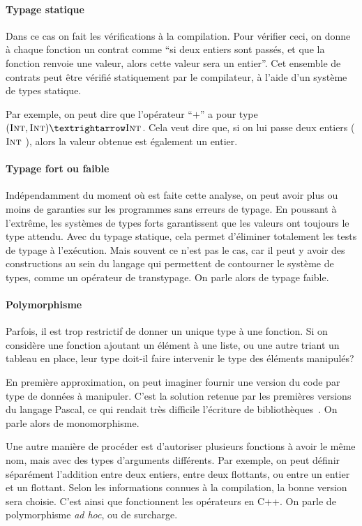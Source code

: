 \paragraph{Typage statique}

Dans ce cas on fait les vérifications à la compilation. Pour vérifier ceci, on
donne à chaque fonction un contrat comme \enquote{si deux entiers sont passés,
et que la fonction renvoie une valeur, alors cette valeur sera un entier}. Cet
ensemble de contrats peut être vérifié statiquement par le compilateur, à l'aide
d'un système de types statique.

Par exemple, on peut dire que l'opérateur \enquote{$+$} a pour type $(\tInt, \tInt) →
\tInt$. Cela veut dire que, si on lui passe deux entiers ($\textsc{Int}$ \tInt), alors
la valeur obtenue est également un entier.

\paragraph{Typage fort ou faible}

Indépendamment du moment où est faite cette analyse, on peut avoir plus ou moins
de garanties sur les programmes sans erreurs de typage. En poussant à l'extrême,
les systèmes de types forts garantissent que les valeurs ont toujours le type
attendu. Avec du typage statique, cela permet d'éliminer totalement les tests de
typage à l'exécution. Mais souvent ce n'est pas le cas, car il peut y avoir des
constructions au sein du langage qui permettent de contourner le système de
types, comme un opérateur de transtypage. On parle alors de typage faible.

\paragraph{Polymorphisme}

Parfois, il est trop restrictif de donner un unique type à une fonction. Si on
considère une fonction ajoutant un élément à une liste, ou une autre
triant un tableau en place, leur type doit-il faire intervenir le type des
éléments manipulés?

En première approximation, on peut imaginer fournir une version du code par type
de données à manipuler. C'est la solution retenue par les premières versions du
langage Pascal, ce qui rendait très difficile l'écriture de
bibliothèques~\cite{PascalNoEscape}. On parle alors de monomorphisme.

Une autre manière de procéder est d'autoriser plusieurs fonctions à avoir le
même nom, mais avec des types d'arguments différents. Par exemple, on peut
définir séparément l'addition entre deux entiers, entre deux flottants, ou entre
un entier et un flottant. Selon les informations connues à la compilation, la
bonne version sera choisie. C'est ainsi que fonctionnent les opérateurs en C++.
On parle de polymorphisme \emph{ad hoc}, ou de surcharge.

